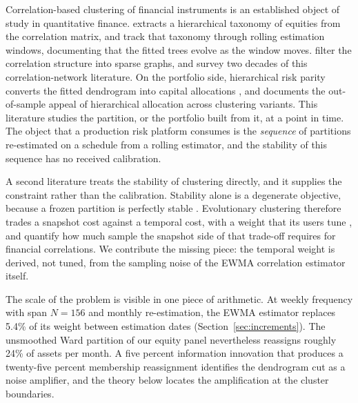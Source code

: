 \documentclass[11pt]{article}
\theoremstyle{remark}
\begin{document}
Correlation-based clustering of financial instruments is an established object
of study in quantitative finance. \citet{mantegna1999hierarchical} extracts a
hierarchical taxonomy of equities from the correlation matrix, and
\citet{onnela2003dynamics} track that taxonomy through rolling estimation
windows, documenting that the fitted trees evolve as the window moves.
\citet{tumminello2005tool} filter the correlation structure into sparse
graphs, and \citet{marti2021review} survey two decades of this
correlation-network literature. On the portfolio side, hierarchical risk
parity converts the fitted dendrogram into capital allocations
\citep{lopezdeprado2016building, lopezdeprado2020machine}, and
\citet{raffinot2017hierarchical} documents the out-of-sample appeal of
hierarchical allocation across clustering variants. This literature studies
the partition, or the portfolio built from it, at a point in time. The object
that a production risk platform consumes is the \emph{sequence} of partitions
re-estimated on a schedule from a rolling estimator, and the stability of this
sequence has no received calibration.

A second literature treats the stability of clustering directly, and it
supplies the constraint rather than the calibration. Stability alone is a
degenerate objective, because a frozen partition is perfectly stable
\citep{bendavid2006sober, vonluxburg2010clustering}. Evolutionary clustering
therefore trades a snapshot cost against a temporal cost, with a weight that
its users tune \citep{chakrabarti2006evolutionary, xu2014adaptive}, and
\citet{marti2016clustering} quantify how much sample the snapshot side of that
trade-off requires for financial correlations. We contribute the missing
piece: the temporal weight is derived, not tuned, from the sampling noise of
the EWMA correlation estimator itself.

The scale of the problem is visible in one piece of arithmetic. At weekly
frequency with span $N=156$ and monthly re-estimation, the EWMA estimator
replaces 5.4\% of its weight between estimation dates
(Section~\ref{sec:increments}). The unsmoothed Ward partition of our equity
panel nevertheless reassigns roughly 24\% of assets per month. A five percent
information innovation that produces a twenty-five percent membership
reassignment identifies the dendrogram cut as a noise amplifier, and the theory
below locates the amplification at the cluster boundaries.
\end{document}
